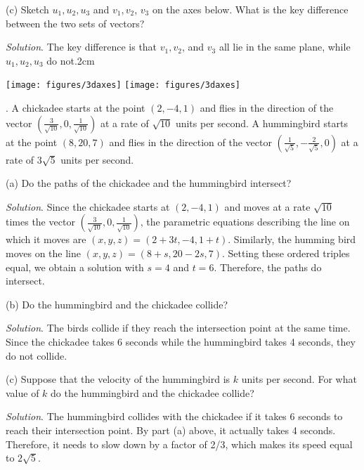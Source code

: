 \documentclass[11pt]{article}
\theoremstyle{definition}
\newcounter{prob}
\newcommand\itm{\theprob.  \stepcounter{prob}}
\newcommand\sol[2]{\textit{Solution}. #1}
\newcommand\sol[2]{#2}
\begin{document}
(c) Sketch $u_1, u_2, u_3$ and  $v_1, v_2$, $v_3$ on the axes below. What is the key difference between the two sets of vectors? 

\sol{The key difference is that $v_1, v_2$, and $v_3$ all lie in the same plane, while $u_1, u_2, u_3$ do not.}

\enlargethispage{2cm} 

\begin{center}
  \texttt{[image: figures/3daxes]} \hspace{3cm}  \texttt{[image: figures/3daxes]} 
\end{center}


\newpage 

\itm A chickadee starts at the point $(2,-4,1)$ and flies in the direction of the vector $\left(\frac{3}{\sqrt{10}},0,\frac{1}{\sqrt{10}}\right)$ at a rate of $\sqrt{10}$ units per second. A hummingbird starts at the point $(8,20,7)$ and flies in the direction of the vector $\left(\frac{1}{\sqrt{5}},-\frac{2}{\sqrt{5}},0\right)$ at a rate of $3\sqrt{5}$ units per second.

(a) Do the paths of the chickadee and the hummingbird intersect? 

\sol{Since the chickadee starts at $(2,-4,1)$ and moves at a rate $\sqrt{10}$ times the vector $(\frac{3}{\sqrt{10}},0,\frac{1}{\sqrt{10}})$, the parametric equations describing the line on which it moves are 
$(x,y,z)=(2+3t,-4,1+t)$. Similarly, the humming bird moves on the line $(x,y,z)=(8+s,20-2s,7)$. Setting these ordered triples equal, we obtain a solution with $s=4$ and $t=6$. Therefore, the paths do intersect. 
}{\vspace{3cm}}

(b) Do the hummingbird and the chickadee collide? 

\sol{The birds collide if they reach the intersection point at the same time. Since the chickadee takes 6 seconds while the hummingbird takes 4 seconds, they do not collide.}{\vspace{3cm}}

(c) Suppose that the velocity of the hummingbird is $k$ units per second. For what value of $k$ do the hummingbird and the chickadee collide? 

\sol{The hummingbird collides with the chickadee if it takes 6 seconds to reach their intersection point. By part (a) above, it actually takes 4 seconds. Therefore, it needs to slow down by a factor of 2/3, which makes its speed equal to $\boxed{2\sqrt{5}}$. }{\vspace{3cm}}
\end{document}
